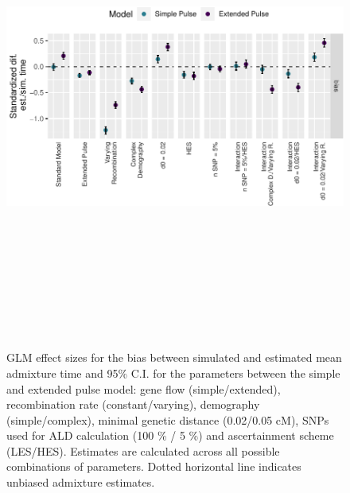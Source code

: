 \documentclass[11pt]{article}
\begin{document}
\begin{figure}
\centering
\includegraphics[width=12cm,height=16cm,keepaspectratio]{Fig_4_MBE-21-0164_R1_Peter_Iasi.pdf}
\caption{\label{fig:figGLM} GLM effect sizes for the bias between simulated and estimated mean admixture time  and 95\% C.I. for the parameters between the simple and extended pulse model: gene flow (simple/extended), recombination rate (constant/varying), demography (simple/complex), minimal genetic distance (0.02/0.05 cM), SNPs used for ALD calculation (100 \% / 5 \%) and ascertainment scheme (LES/HES). Estimates are calculated across all possible combinations of parameters. Dotted horizontal line indicates unbiased admixture estimates.}
\end{figure}
\end{document}
